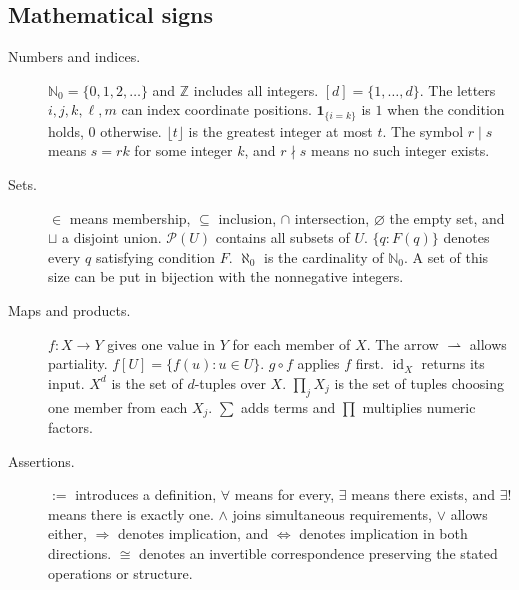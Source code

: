 \subsection*{Mathematical signs}
\begin{description}
\item[Numbers and indices.] $\mathbb N_0=\{0,1,2,\ldots\}$ and $\mathbb Z$ includes all integers. $[d]=\{1,\ldots,d\}$. The letters $i,j,k,\ell,m$ can index coordinate positions. $\mathbf1_{\{i=k\}}$ is $1$ when the condition holds, $0$ otherwise. $\lfloor t\rfloor$ is the greatest integer at most $t$. The symbol $r\mid s$ means $s=rk$ for some integer $k$, and $r\nmid s$ means no such integer exists.
\item[Sets.] $\in$ means membership, $\subseteq$ inclusion, $\cap$ intersection, $\varnothing$ the empty set, and $\sqcup$ a disjoint union. $\mathcal P(U)$ contains all subsets of $U$. $\{q:F(q)\}$ denotes every $q$ satisfying condition $F$. $\aleph_0$ is the cardinality of $\mathbb N_0$. A set of this size can be put in bijection with the nonnegative integers.
\item[Maps and products.] $f:X\to Y$ gives one value in $Y$ for each member of $X$. The arrow $\rightharpoonup$ allows partiality. $f[U]=\{f(u):u\in U\}$. $g\circ f$ applies $f$ first. $\operatorname{id}_X$ returns its input. $X^d$ is the set of $d$-tuples over $X$. $\prod_j X_j$ is the set of tuples choosing one member from each $X_j$. $\sum$ adds terms and $\prod$ multiplies numeric factors.
\item[Assertions.] $:=$ introduces a definition, $\forall$ means for every, $\exists$ means there exists, and $\exists!$ means there is exactly one. $\land$ joins simultaneous requirements, $\lor$ allows either, $\Rightarrow$ denotes implication, and $\iff$ denotes implication in both directions. $\cong$ denotes an invertible correspondence preserving the stated operations or structure.
\end{description}


